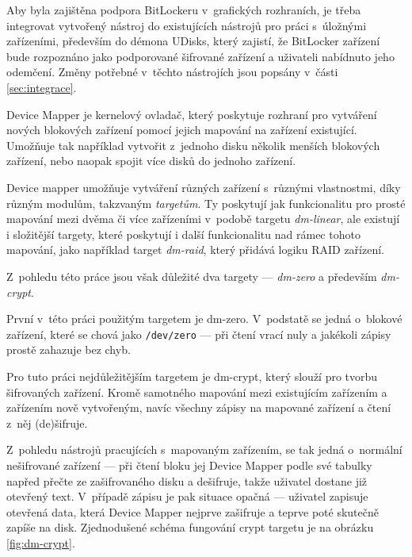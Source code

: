 Aby byla zajištěna podpora BitLockeru v~grafických rozhraních, je třeba integrovat vytvořený nástroj do existujících nástrojů pro práci s~úložnými zařízeními, především do démona UDisks, který zajistí, že BitLocker zařízení bude rozpoznáno jako podporované šifrované zařízení a uživateli nabídnuto jeho odemčení. Změny potřebné v~těchto nástrojích jsou popsány v~části \ref{sec:integrace}.

\label{sec:device-mapper}

Device Mapper je kernelový ovladač, který poskytuje rozhraní pro vytváření nových blokových zařízení pomocí jejich mapování na zařízení existující. Umožňuje tak například vytvořit z~jednoho disku několik menších blokových zařízení, nebo naopak spojit více disků do jednoho zařízení.\cite{RedHat2019}

Device mapper umožňuje vytváření různých zařízení s~různými vlastnostmi, díky různým modulům, takzvaným \emph{targetům}. Ty poskytují jak funkcionalitu pro prosté mapování mezi dvěma či více zařízeními v~podobě targetu \emph{dm-linear}, ale existují i složitější targety, které poskytují i další funkcionalitu nad rámec tohoto mapování, jako například target \emph{dm-raid}, který přidává logiku RAID zařízení.

Z~pohledu této práce jsou však důležité dva targety --- \emph{dm-zero} a především \emph{dm-crypt}.


První v~této práci použitým targetem je dm-zero. V~podstatě se jedná o~blokové zařízení, které se chová jako \texttt{/dev/zero} --- při čtení vrací nuly a jakékoli zápisy prostě zahazuje bez chyb.\cite{KernelZero}


Pro tuto práci nejdůležitějším targetem je dm-crypt, který slouží pro tvorbu šifrovaných zařízení. Kromě samotného mapování mezi existujícím zařízením a zařízením nově vytvořeným, navíc všechny zápisy na mapované zařízení a čtení z~něj (de)šifruje.\cite{Broz2018}

Z~pohledu nástrojů pracujících s~mapovaným zařízením, se tak jedná o~normální nešifrované zařízení --- při čtení bloku jej Device Mapper podle své tabulky napřed přečte ze zašifrovaného disku a dešifruje, takže uživatel dostane již otevřený text. V~případě zápisu je pak situace opačná --- uživatel zapisuje otevřená data, která Device Mapper nejprve zašifruje a teprve poté skutečně zapíše na disk. Zjednodušené schéma fungování crypt targetu je na obrázku \ref{fig:dm-crypt}.

